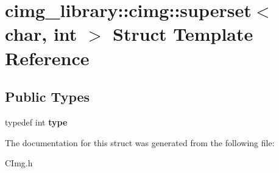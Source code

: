 \hypertarget{structcimg__library_1_1cimg_1_1superset_3_01char_00_01int_01_4}{\section{cimg\-\_\-library\-:\-:cimg\-:\-:superset$<$ char, int $>$ Struct Template Reference}
\label{structcimg__library_1_1cimg_1_1superset_3_01char_00_01int_01_4}
}
\subsection*{Public Types}
\begin{DoxyCompactItemize}
\item 
\hypertarget{structcimg__library_1_1cimg_1_1superset_3_01char_00_01int_01_4_a58dbd2aedf769d202bfc71eaab7ae257}{typedef int {\bfseries type}}\label{structcimg__library_1_1cimg_1_1superset_3_01char_00_01int_01_4_a58dbd2aedf769d202bfc71eaab7ae257}

\end{DoxyCompactItemize}


The documentation for this struct was generated from the following file\-:\begin{DoxyCompactItemize}
\item 
C\-Img.\-h\end{DoxyCompactItemize}
